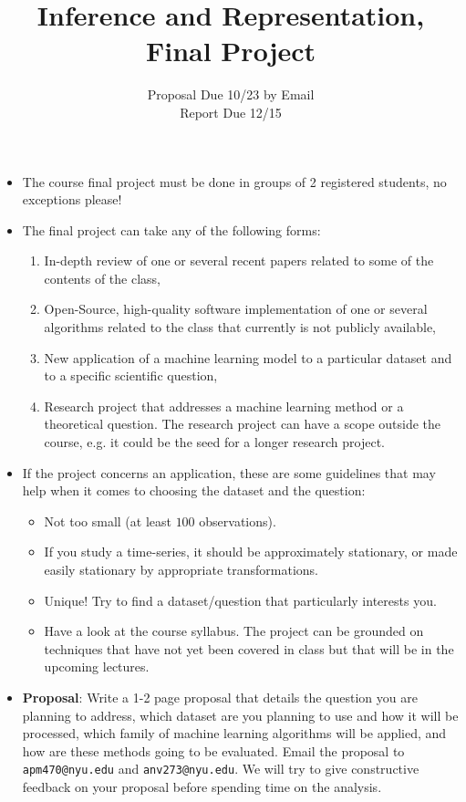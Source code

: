 \documentclass[11pt]{article}
\title{Inference and Representation, Final Project}
\author{Proposal Due 10/23 by Email \\
Report Due 12/15}
\begin{document}
\maketitle

\begin{itemize}
\item The course final project must be done in groups of  2
  registered students, no exceptions please!

\item The final project can take any of the following forms:
\begin{enumerate}
\item In-depth review of one or several recent papers related to some of the contents of the class,
\item Open-Source, high-quality software implementation of one or several algorithms related to the class that currently is not publicly available,
\item New application of a machine learning model to a particular dataset and to a specific scientific question,
\item Research project that addresses a machine learning method or a theoretical question. The research project can have a scope outside the course, e.g. it could be the seed for a longer research project.
\end{enumerate}


\item If the project concerns an application, these are some guidelines that may help when it comes to choosing the dataset and the question:
\begin{itemize}
\item Not too small (at least $100$ observations).
\item If you study a time-series, it should be approximately stationary, or made easily stationary by appropriate transformations.
\item Unique! Try to find a dataset/question that particularly interests you. 
\item Have a look at the course syllabus. The project can be grounded on techniques that have not yet been covered in class but that will be in the upcoming lectures.
\end{itemize}

\item \textbf{Proposal}: Write a 1-2 page proposal that details the question you are planning to address, which dataset are you planning to use and how it will be processed, which family of machine learning algorithms will be applied, and how are these methods going to be evaluated.  Email the proposal to \texttt{apm470@nyu.edu} and \texttt{anv273@nyu.edu}. We will try to give constructive feedback on your proposal before spending time on the analysis. 
 

\end{itemize}
\end{document}
